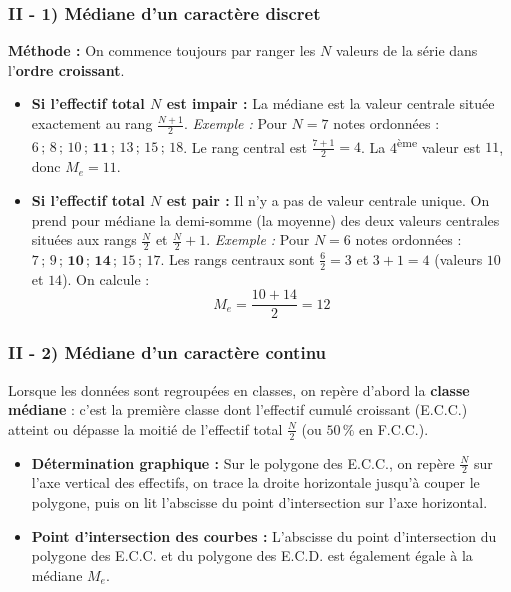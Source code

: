 \documentclass[11pt, a4paper]{article}
\begin{document}
\subsubsection*{II - 1) Médiane d'un caractère discret}
\textbf{Méthode :} On commence toujours par ranger les $N$ valeurs de la série dans l'\textbf{ordre croissant}.
\begin{itemize}
    \item \textbf{Si l'effectif total $N$ est impair :} La médiane est la valeur centrale située exactement au rang $\frac{N + 1}{2}$.
    \textit{Exemple :} Pour $N = 7$ notes ordonnées : $6 \,;\, 8 \,;\, 10 \,;\, \mathbf{11} \,;\, 13 \,;\, 15 \,;\, 18$. Le rang central est $\frac{7+1}{2} = 4$. La 4\textsuperscript{ème} valeur est $11$, donc $M_e = 11$.
    \item \textbf{Si l'effectif total $N$ est pair :} Il n'y a pas de valeur centrale unique. On prend pour médiane la demi-somme (la moyenne) des deux valeurs centrales situées aux rangs $\frac{N}{2}$ et $\frac{N}{2} + 1$.
    \textit{Exemple :} Pour $N = 6$ notes ordonnées : $7 \,;\, 9 \,;\, \mathbf{10} \,;\, \mathbf{14} \,;\, 15 \,;\, 17$. Les rangs centraux sont $\frac{6}{2} = 3$ et $3+1 = 4$ (valeurs $10$ et $14$). On calcule :
    \[
        M_e = \frac{10 + 14}{2} = 12
    \]
\end{itemize}

\subsubsection*{II - 2) Médiane d'un caractère continu}
Lorsque les données sont regroupées en classes, on repère d'abord la \textbf{classe médiane} : c'est la première classe dont l'effectif cumulé croissant (E.C.C.) atteint ou dépasse la moitié de l'effectif total $\frac{N}{2}$ (ou $50\,\%$ en F.C.C.).
\begin{itemize}
    \item \textbf{Détermination graphique :} Sur le polygone des E.C.C., on repère $\frac{N}{2}$ sur l'axe vertical des effectifs, on trace la droite horizontale jusqu'à couper le polygone, puis on lit l'abscisse du point d'intersection sur l'axe horizontal.
    \item \textbf{Point d'intersection des courbes :} L'abscisse du point d'intersection du polygone des E.C.C. et du polygone des E.C.D. est également égale à la médiane $M_e$.
\end{itemize}
\end{document}
